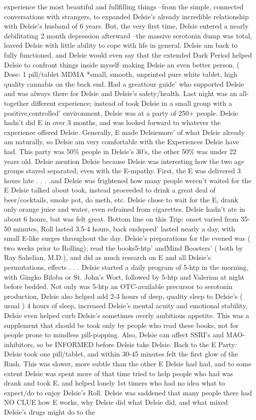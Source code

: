 \documentclass[12pt]{book}
\begin{document}
experience the most beautiful and fullfilling things --from the simple, connected conversations with strangers, to expanded Delsie's already incredible relationship with Delsie's husband of 6 years. But, the very first time, Delsie entered a nearly debilitating 2 month depression afterward --the massive serotonin dump was total, leaved Delsie with little ability to cope with life in general. Delsie am back to fully functioned, and Delsie would even say that the extended Dark Period helped Delsie to confront things inside myself--making Delsie an even better person. ( Dose: 1 pill/tablet MDMA *small, smooth, unprinted pure white tablet, high quality cannabis on the back end. Had a greattour guide' who supported Delsie and was always there for Delsie and Delsie's safety/health. Last night was an all-together different experience; instead of took Delsie in a small group with a positive,controlled' environment, Delsie was at a party of 250+ people. Delsie hadn't did E in over 3 months, and was looked forward to whatever the experience offered Delsie. Generally, E made Delsiemore' of what Delsie already am naturally, so Delsie am very comfortable with the Experiences Delsie have had. This party was 50\% people in Delsie's 30's, the other 50\% was under 22 years old. Delsie mention Delsie because Delsie was interesting how the two age groups stayed separated, even with the E-mpathy. First, the E was delivered 3 hours late . . .  .and Delsie was frightened how many people weren't waited for the E Delsie talked about took, instead proceeded to drink a great deal of beer/cocktails, smoke pot, do meth, etc. Delsie chose to wait for the E, drank only orange juice and water, even refrained from cigarettes. Delsie hadn't ate in about 6 hours, but was felt great. Bottom line on this Trip: onset varied from 35-50 minutes, Roll lasted 3.5-4 hours, back endspeed' lasted nearly a day, with small E-like surges throughout the day. Delsie's preparations for the evened was ( two weeks prior to Rolling); read the books5-htp' andMind Boosters' ( both by Ray Sahelian, M.D.), and did as much research on E and all Delsie's permutations, effects . . .  Delsie started a daily program of 5-htp in the morning, with Gingko Biloba or St. John's Wort, followed by 5-htp and Valerian at night before bedded. Not only was 5-htp an OTC-available precursor to serotonin production, Delsie also helped add 2-3 hours of deep, quality sleep to Delsie's ( usual ) 4 hours of sleep, increased Delsie's mental acuity and emotional stability, Delsie even helped curb Delsie's sometimes overly ambitious appetite. This was a supplement that should be took only by people who read these books, not for people prone to mindless pill-popping. Also, Delsie can affect SSRI's and MAO-inhibitors, so be INFORMED before Delsie take Delsie. Back to the E Party: Delsie took one pill/tablet, and within 30-45 minutes felt the first glow of the Rush. This was slower, more subtle than the other E Delsie had had, and to some extent Delsie was spent more of that time tried to help people who had was drank and took E, and helped lonely 1st timers who had no idea what to expect/do to enjoy Delsie's Roll. Delsie was saddened that many people there had NO CLUE how E works, why Delsie did what Delsie did, and what mixed Delsie's drugs might do to the 
\end{document}
